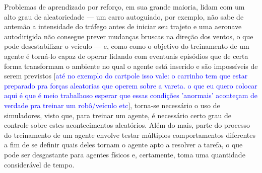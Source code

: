 \documentclass[cic,tc]{iiufrgs}
\newcommand\henrique[1]{\textcolor{blue}{#1}}
\begin{document}
    
    
    Problemas de aprendizado por reforço, em sua grande maioria, lidam com um alto grau de aleatoriedade --- um carro autoguiado, por exemplo, não sabe de
    antemão a intensidade do tráfego antes de iniciar seu trajeto e uma aeronave autodirigida não consegue prever mudanças bruscas na direção dos ventos, o que
    pode desestabilizar o veículo --- e, como como o objetivo do treinamento de um agente é torná-lo capaz de operar lidando com eventuais episódios que de
    certa forma transformam o ambiente no qual o agente está inserido e são impossíveis de serem previstos [\henrique{até no exemplo do cartpole isso vale:
    o carrinho tem que estar preparado pra forças aleatorias que operem sobre a vareta.
    o que eu quero colocar aqui é que é meio trabalhoso esperar que essas condições 'anormais' aconteçam de verdade pra treinar um robô/veículo etc}],
    torna-se necessário o uso de simuladores, visto que, para treinar um agente, é necessário certo grau de controle sobre estes acontecimentos aleatórios.
    Além do mais, parte do processo do treinamento de um agente envolve testar múltiplos comportamentos diferentes a fim de se definir quais deles tornam o
    agente apto a resolver a tarefa, o que pode ser desgastante para agentes físicos e, certamente, toma uma quantidade considerável de tempo.
    
\end{document}

